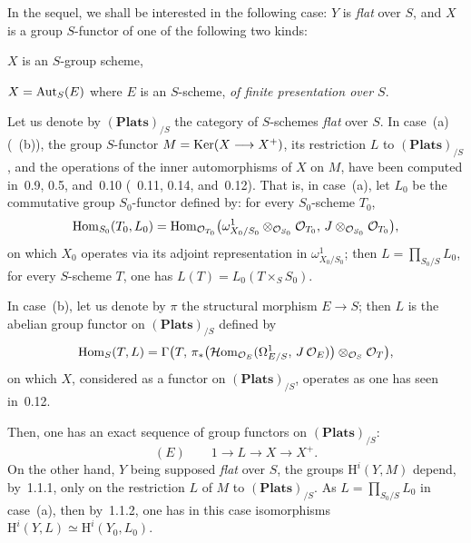 \label{III.2.0}
{\renewcommand{\thefootnote}{(52)}}
In the sequel, we shall be interested in the following case: \(Y\) is
\emph{flat} over \(S\), and \(X\) is a group \(S\)-functor of one of the
following two kinds:
\begin{enumeratea}
\item \(X\) is an \(S\)-group scheme,
\item \(X=\operatorname{Aut}_{S}(E)\) where \(E\) is an \(S\)-scheme, \emph{of finite
presentation over \(S\)}.
\end{enumeratea}
Let us denote by \((\mathbf{Plats})_{/S}\) the category of \(S\)-schemes
\emph{flat} over \(S\). In case~(a) (\resp~(b)), the group \(S\)-functor
\(M=\operatorname{Ker}(X\longrightarrow X^{+})\), its restriction \(L\) to \((\mathbf{Plats})_{/S}\),
and the operations of the inner automorphisms of \(X\) on \(M\), have been
computed in~0.9, 0.5, and~0.10 (\resp~0.11, 0.14, and~0.12). That is, in
case~(a), let \(L_{0}\) be the commutative group \(S_{0}\)-functor defined
by: for every \(S_{0}\)-scheme \(T_{0}\),
\[
\operatorname{Hom}_{S_{0}}(T_{0},L_{0})
=\operatorname{Hom}_{\mathcal{O}_{T_{0}}}\bigl(
  \omega^{1}_{X_{0}/S_{0}}\otimes_{\mathcal{O}_{S_{0}}}\mathcal{O}_{T_{0}},\,
  J\otimes_{\mathcal{O}_{S_{0}}}\mathcal{O}_{T_{0}}\bigr),
\]
on which \(X_{0}\) operates via its adjoint representation in
\(\omega^{1}_{X_{0}/S_{0}}\); then \(L=\prod_{S_{0}/S}L_{0}\), \ie for every
\(S\)-scheme \(T\), one has \(L(T)=L_{0}(T\times_{S}S_{0})\).

In case~(b), let us denote by \(\pi\) the structural morphism \(E\to S\);
then \(L\) is the abelian group functor on \((\mathbf{Plats})_{/S}\)
defined by
\[
\operatorname{Hom}_{S}(T,L)
=\Gamma\bigl(T,\,
  \pi_{*}\bigl(\mathcal{H}\mathrm{om}_{\mathcal{O}_{E}}
    (\Omega^{1}_{E/S},\, J\,\mathcal{O}_{E})\bigr)
  \otimes_{\mathcal{O}_S}\mathcal{O}_{T}\bigr),
\]
on which \(X\), considered as a functor on \((\mathbf{Plats})_{/S}\),
operates as one has seen in~0.12.

Then, one has an exact sequence of group functors on
\((\mathbf{Plats})_{/S}\):
\[
(E)\qquad 1\longrightarrow L\longrightarrow X\longrightarrow X^{+}.
\]
On the other hand, \(Y\) being supposed \emph{flat} over \(S\), the groups
\(\mathrm{H}^{i}(Y,M)\) depend, by~1.1.1, only on the restriction \(L\) of
\(M\) to \((\mathbf{Plats})_{/S}\). As \(L=\prod_{S_{0}/S}L_{0}\) in
case~(a), then by~1.1.2, one has in this case isomorphisms
\(\mathrm{H}^{i}(Y,L)\simeq\mathrm{H}^{i}(Y_{0},L_{0})\).

